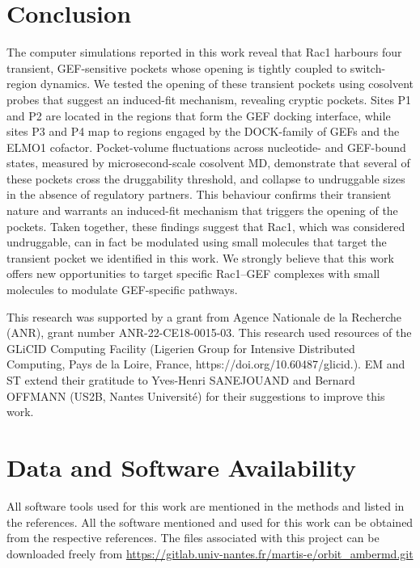 \documentclass[12pt, a4paper]{achemso}
\begin{document}
\section{Conclusion}
The computer simulations reported in this work reveal that Rac1 harbours four transient, GEF-sensitive pockets whose opening is tightly coupled to switch-region dynamics. We tested the opening of these transient pockets using cosolvent probes that suggest an induced-fit mechanism, revealing cryptic pockets. Sites P1 and P2 are located in the regions that form the GEF docking interface, while sites P3 and P4 map to regions engaged by the DOCK-family of GEFs and the ELMO1 cofactor. Pocket-volume fluctuations across nucleotide- and GEF-bound states, measured by microsecond-scale cosolvent MD, demonstrate that several of these pockets cross the druggability threshold, and collapse to undruggable sizes in the absence of regulatory partners. This behaviour confirms their transient nature and warrants an induced-fit mechanism that triggers the opening of the pockets. Taken together, these findings suggest that Rac1, which was considered undruggable, can in fact be modulated using small molecules that target the transient pocket we identified in this work. We strongly believe that this work offers new opportunities to target specific Rac1–GEF complexes with small molecules to modulate GEF-specific pathways. 

\begin{acknowledgement}
This research was supported by a grant from Agence Nationale de la Recherche (ANR), grant number ANR-22-CE18-0015-03. This research used resources of the GLiCID Computing Facility (Ligerien Group for Intensive Distributed Computing, Pays de la Loire, France, https://doi.org/10.60487/glicid.). EM and ST extend their gratitude to Yves-Henri SANEJOUAND and Bernard OFFMANN (US2B, Nantes Université) for their suggestions to improve this work. 
\end{acknowledgement}

\section{Data and Software Availability}
All software tools used for this work are mentioned in the methods and listed in the references. All the software mentioned and used for this work can be obtained from the respective references. The files associated with this project can be downloaded freely from  \url{https://gitlab.univ-nantes.fr/martis-e/orbit_ambermd.git}
\end{document}
